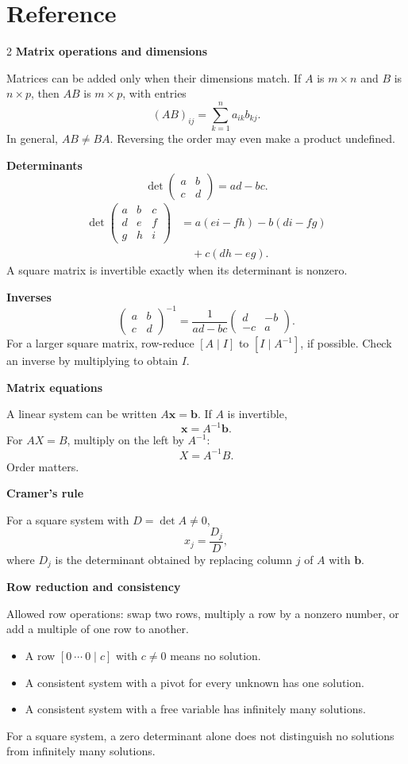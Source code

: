 \documentclass[11pt]{article}
\begin{document}
\section*{Reference}
\begin{multicols}{2}
\small
\textbf{Matrix operations and dimensions}

Matrices can be added only when their dimensions match. If $A$ is $m\times n$
and $B$ is $n\times p$, then $AB$ is $m\times p$, with entries
\[
  (AB)_{ij}=\sum_{k=1}^{n}a_{ik}b_{kj}.
\]
In general, $AB\ne BA$. Reversing the order may even make a product undefined.

\medskip
\textbf{Determinants}
\[
  \det\begin{pmatrix}a&b\\c&d\end{pmatrix}=ad-bc.
\]
\[
\begin{aligned}
  \det\begin{pmatrix}a&b&c\\d&e&f\\g&h&i\end{pmatrix}
  &=a(ei-fh)-b(di-fg)\\
  &\quad+c(dh-eg).
\end{aligned}
\]
A square matrix is invertible exactly when its determinant is nonzero.

\medskip
\textbf{Inverses}
\[
  \begin{pmatrix}a&b\\c&d\end{pmatrix}^{-1}
  =\frac1{ad-bc}\begin{pmatrix}d&-b\\-c&a\end{pmatrix}.
\]
For a larger square matrix, row-reduce $[A\mid I]$ to $[I\mid A^{-1}]$,
if possible. Check an inverse by multiplying to obtain $I$.

\columnbreak
\textbf{Matrix equations}

A linear system can be written $A\mathbf x=\mathbf b$. If $A$ is invertible,
\[
  \mathbf x=A^{-1}\mathbf b.
\]
For $AX=B$, multiply on the left by $A^{-1}$:
\[
  X=A^{-1}B.
\]
Order matters.

\medskip
\textbf{Cramer's rule}

For a square system with $D=\det A\ne0$,
\[
  x_j=\frac{D_j}{D},
\]
where $D_j$ is the determinant obtained by replacing column $j$ of $A$ with
$\mathbf b$.

\medskip
\textbf{Row reduction and consistency}

Allowed row operations: swap two rows, multiply a row by a nonzero number,
or add a multiple of one row to another.
\begin{itemize}[leftmargin=*,itemsep=0.3em]
  \item A row $[0\ \cdots\ 0\mid c]$ with $c\ne0$ means no solution.
  \item A consistent system with a pivot for every unknown has one solution.
  \item A consistent system with a free variable has infinitely many solutions.
\end{itemize}
For a square system, a zero determinant alone does not distinguish no
solutions from infinitely many solutions.
\end{multicols}
\end{document}
